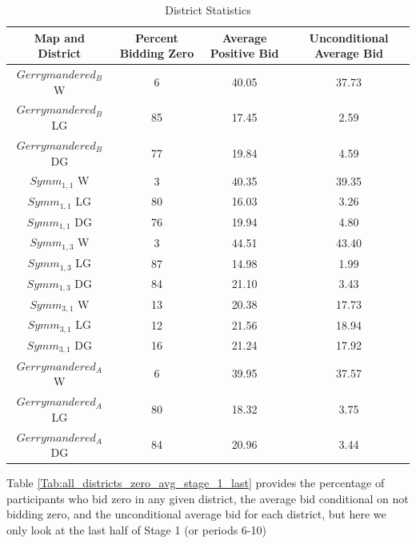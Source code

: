 \documentclass[AER]{AEA}
\begin{document}
\begin{table}
\caption{District Statistics} 
\begin{center}
 \begin{tabular}{|c c c c|} 
 \hline
 Map and District & Percent Bidding Zero & Average Positive Bid & Unconditional Average Bid \\ [0.5ex] 
 \hline
 $Gerrymandered_B$ W & 6 & 40.05 & 37.73 \\
 $Gerrymandered_B$ LG & 85 & 17.45 & 2.59 \\
 $Gerrymandered_B$ DG & 77 & 19.84 & 4.59 \\
  \hline
 $Symm_{1,1}$ W & 3 & 40.35 & 39.35 \\
 $Symm_{1,1}$ LG & 80 & 16.03 & 3.26 \\
 $Symm_{1,1}$ DG & 76 & 19.94 & 4.80 \\
  \hline
 $Symm_{1,3}$ W & 3 & 44.51 & 43.40 \\
 $Symm_{1,3}$ LG & 87 & 14.98 & 1.99 \\
 $Symm_{1,3}$ DG & 84 & 21.10 & 3.43 \\
  \hline
 $Symm_{3,1}$ W & 13 & 20.38 & 17.73 \\
 $Symm_{3,1}$ LG & 12 & 21.56 & 18.94 \\
 $Symm_{3,1}$ DG & 16 & 21.24 & 17.92 \\
  \hline
 $Gerrymandered_A$ W & 6 & 39.95 & 37.57 \\
 $Gerrymandered_A$ LG & 80 & 18.32 & 3.75 \\
 $Gerrymandered_A$ DG & 84 & 20.96 & 3.44 \\
 \hline
\end{tabular}
\label{Tab:all_districts_zero_avg}
\end{center}
\end{table}


Table \ref{Tab:all_districts_zero_avg_stage_1_last} provides the percentage of participants who bid zero in any given district, the average bid conditional on not bidding zero, and the unconditional average bid for each district, but here we only look at the last half of Stage 1 (or periods 6-10)
\end{document}
